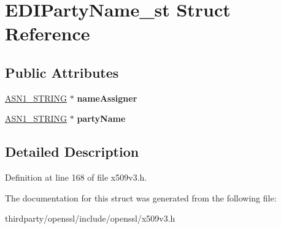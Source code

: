 \hypertarget{struct_e_d_i_party_name__st}{}\section{E\+D\+I\+Party\+Name\+\_\+st Struct Reference}
\label{struct_e_d_i_party_name__st}
\subsection*{Public Attributes}
\begin{DoxyCompactItemize}
\item 
\mbox{\label{struct_e_d_i_party_name__st_a433a2feeea84e1856f17d0aaba7479fa}} 
\hyperlink{structasn1__string__st}{A\+S\+N1\+\_\+\+S\+T\+R\+I\+NG} $\ast$ {\bfseries name\+Assigner}
\item 
\mbox{\label{struct_e_d_i_party_name__st_ae0f4115f0794169a894b8a6e01539e50}} 
\hyperlink{structasn1__string__st}{A\+S\+N1\+\_\+\+S\+T\+R\+I\+NG} $\ast$ {\bfseries party\+Name}
\end{DoxyCompactItemize}


\subsection{Detailed Description}


Definition at line 168 of file x509v3.\+h.



The documentation for this struct was generated from the following file\+:\begin{DoxyCompactItemize}
\item 
thirdparty/openssl/include/openssl/x509v3.\+h\end{DoxyCompactItemize}
